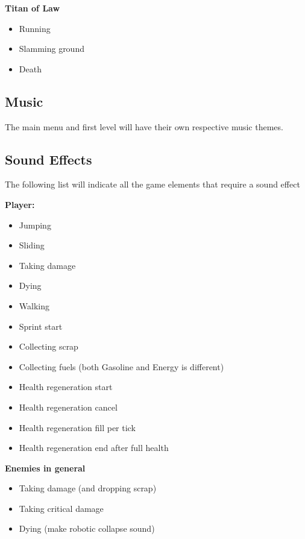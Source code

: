 \documentclass[../Main.tex]{subfiles}
\begin{document}
\textbf{Titan of Law}
\begin{itemize}
	\item Running
	\item Slamming ground
	\item Death
\end{itemize}


\subsection{Music}

The main menu and first level will have their own respective music themes. 

\subsection{Sound Effects}

The following list will indicate all the game elements that require a sound effect\newline

\textbf{Player:}
\begin{itemize}
	\item Jumping
	\item Sliding
	\item Taking damage
	\item Dying
	\item Walking
	\item Sprint start
	\item Collecting scrap
	\item Collecting fuels (both Gasoline and Energy is different)
	\item Health regeneration start
	\item Health regeneration cancel
	\item Health regeneration fill per tick
	\item Health regeneration end after full health
\end{itemize}

\textbf{Enemies in general}
\begin{itemize}
	\item Taking damage (and dropping scrap)
	\item Taking critical damage
	\item Dying (make robotic collapse sound)
\end{itemize}
\end{document}

